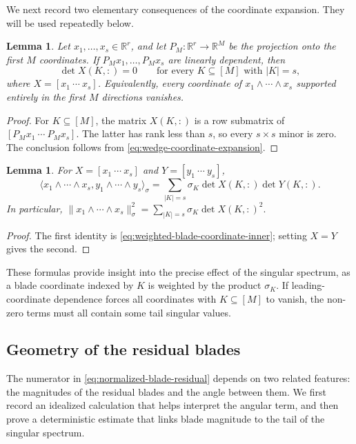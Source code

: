 \documentclass[11pt, preprint]{article}
\newtheorem{lemma}[theorem]{Lemma}
\newcommand{\R}{\mathbb{R}}
\newcommand{\inner}[1]{\langle #1\rangle}
\begin{document}
We next record two elementary consequences of the coordinate expansion. They will be used repeatedly below.

\begin{lemma} \label{lem:exterior_lin_dep}
Let $x_1,\ldots,x_s\in\R^r$, and let $P_M:\R^r\to\R^M$ be the projection onto the first $M$ coordinates. If
$P_Mx_1,\ldots,P_Mx_s$ are linearly dependent, then
\[
\det X(K,:)=0
\qquad
\text{for every }K\subseteq[M]\text{ with }|K|=s,
\]
where $X=[x_1\ \cdots\ x_s]$. Equivalently, every coordinate of
$x_1\wedge\cdots\wedge x_s$ supported entirely in the first $M$ directions vanishes.
\end{lemma}

\begin{proof}
For $K\subseteq[M]$, the matrix $X(K,:)$ is a row submatrix of
$[P_Mx_1\ \cdots\ P_Mx_s]$. The latter has rank less than $s$, so every $s\times s$ minor is zero. The conclusion follows from \eqref{eq:wedge-coordinate-expansion}.
\end{proof}

\begin{lemma} \label{lem:k_blade_inner_form}
For $X=[x_1\ \cdots\ x_s]$ and $Y=[y_1\ \cdots\ y_s]$,
\[
\inner{x_1\wedge\cdots\wedge x_s,
       y_1\wedge\cdots\wedge y_s}_\sigma
=
\sum_{|K|=s}\sigma_K\det X(K,:)\det Y(K,:).
\]
In particular,
\(
\|x_1\wedge\cdots\wedge x_s\|_\sigma^2
=
\sum_{|K|=s}\sigma_K\det X(K,:)^2.
\)
\end{lemma}

\begin{proof}
The first identity is \eqref{eq:weighted-blade-coordinate-inner}; setting $X=Y$ gives the second.
\end{proof}

These formulas provide insight into the precise effect of the singular spectrum, as a blade coordinate indexed by $K$ is weighted by the product $\sigma_K$. If leading-coordinate dependence forces all coordinates with $K\subseteq[M]$ to vanish, the non-zero terms must all contain some tail singular values. 

\subsection{Geometry of the residual blades}\label{sec:understand_k_blades}

The numerator in \eqref{eq:normalized-blade-residual} depends on two related features: the magnitudes of the residual blades and the angle between them. We first record an idealized calculation that helps interpret the angular term, and then prove a deterministic estimate that links blade magnitude to the tail of the singular spectrum.
\end{document}

